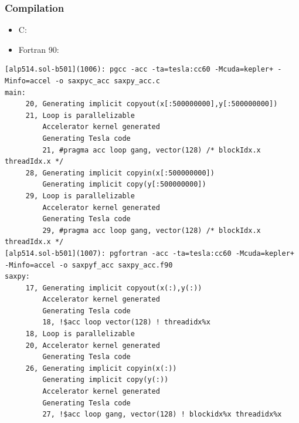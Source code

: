 \documentclass[10pt,t]{beamer}
\begin{document}
\scriptsize
\begin{frame}[fragile]
  \frametitle{Compilation}
  \begin{itemize}
    \item C: 
    \item Fortran 90:
  \end{itemize}
  \begin{block}{}
    {\fontsize{4}{5}\selectfont
      \begin{Verbatim}
[alp514.sol-b501](1006): pgcc -acc -ta=tesla:cc60 -Mcuda=kepler+ -Minfo=accel -o saxpyc_acc saxpy_acc.c
main:
     20, Generating implicit copyout(x[:500000000],y[:500000000])
     21, Loop is parallelizable
         Accelerator kernel generated
         Generating Tesla code
         21, #pragma acc loop gang, vector(128) /* blockIdx.x threadIdx.x */
     28, Generating implicit copyin(x[:500000000])
         Generating implicit copy(y[:500000000])
     29, Loop is parallelizable
         Accelerator kernel generated
         Generating Tesla code
         29, #pragma acc loop gang, vector(128) /* blockIdx.x threadIdx.x */
[alp514.sol-b501](1007): pgfortran -acc -ta=tesla:cc60 -Mcuda=kepler+ -Minfo=accel -o saxpyf_acc saxpy_acc.f90
saxpy:
     17, Generating implicit copyout(x(:),y(:))
         Accelerator kernel generated
         Generating Tesla code
         18, !$acc loop vector(128) ! threadidx%x
     18, Loop is parallelizable
     20, Accelerator kernel generated
         Generating Tesla code
     26, Generating implicit copyin(x(:))
         Generating implicit copy(y(:))
         Accelerator kernel generated
         Generating Tesla code
         27, !$acc loop gang, vector(128) ! blockidx%x threadidx%x
      \end{Verbatim}
    }
  \end{block}
\end{frame}
\end{document}
